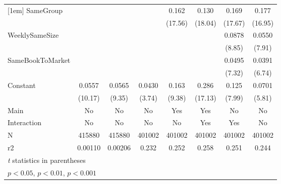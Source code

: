 {\begin{tabular}{l*{7}{c}}
[1em]
SameGroup           &                     &                     &                     &       0.162\sym{***}&       0.130\sym{***}&       0.169\sym{***}&       0.177\sym{***}\\
                    &                     &                     &                     &     (17.56)         &     (18.04)         &     (17.67)         &     (16.95)         \\
[1em]
WeeklySameSize      &                     &                     &                     &                     &                     &      0.0878\sym{***}&      0.0550\sym{***}\\
                    &                     &                     &                     &                     &                     &      (8.85)         &      (7.91)         \\
[1em]
SameBookToMarket    &                     &                     &                     &                     &                     &      0.0495\sym{***}&      0.0391\sym{***}\\
                    &                     &                     &                     &                     &                     &      (7.32)         &      (6.74)         \\
[1em]
Constant            &      0.0557\sym{***}&      0.0565\sym{***}&      0.0430\sym{***}&       0.163\sym{***}&       0.286\sym{***}&       0.125\sym{***}&      0.0701\sym{***}\\
                    &     (10.17)         &      (9.35)         &      (3.74)         &      (9.38)         &     (17.13)         &      (7.99)         &      (5.81)         \\
\hline
Main                &          No         &          No         &          No         &         Yes         &         Yes         &          No         &          No         \\
Interaction         &          No         &          No         &          No         &          No         &         Yes         &         Yes         &          No         \\
N                   &      415880         &      415880         &      401002         &      401002         &      401002         &      401002         &      401002         \\
r2                  &     0.00110         &     0.00206         &       0.232         &       0.252         &       0.258         &       0.251         &       0.244         \\
\hline\hline
\multicolumn{8}{l}{\footnotesize \textit{t} statistics in parentheses}\\
\multicolumn{8}{l}{\footnotesize \sym{*} \(p<0.05\), \sym{**} \(p<0.01\), \sym{***} \(p<0.001\)}\\
\end{tabular}
}
